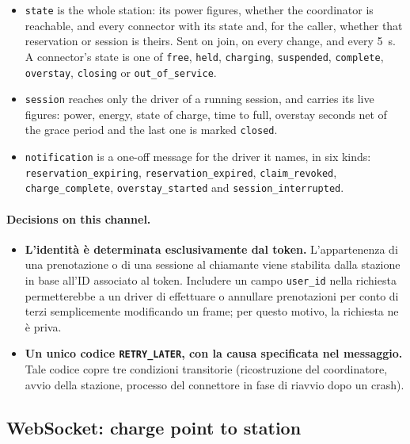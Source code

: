 \begin{itemize}
  \item \texttt{state} is the whole station: its power figures, whether the coordinator is
        reachable, and every connector with its state and, for the caller, whether that
        reservation or session is theirs. Sent on join, on every change, and every 5~s. A connector's
        state is one of \texttt{free}, \texttt{held}, \texttt{charging}, \texttt{suspended},
        \texttt{complete}, \texttt{overstay}, \texttt{closing} or \texttt{out\_of\_service}.
  \item \texttt{session} reaches only the driver of a running
        session, and carries its live figures: power, energy, state of charge, time to full,
        overstay seconds net of the grace period and the last one is marked \texttt{closed}.
  \item \texttt{notification} is a one-off message for the driver it names, in six kinds:
        \texttt{reservation\_\allowbreak expiring},
        \texttt{reservation\_\allowbreak expired},
        \texttt{claim\_\allowbreak revoked},
        \texttt{charge\_\allowbreak complete},
        \texttt{overstay\_\allowbreak started} and
        \texttt{session\_\allowbreak interrupted}.
\end{itemize}

\paragraph{Decisions on this channel.}
\begin{itemize}
  \item \textbf{L'identità è determinata esclusivamente dal token.} L'appartenenza di una prenotazione o di una sessione al chiamante viene stabilita dalla stazione in base all'ID associato al token. Includere un campo \texttt{user\_id} nella richiesta permetterebbe a un driver di effettuare o annullare prenotazioni per conto di terzi semplicemente modificando un frame; per questo motivo, la richiesta ne è priva.
  \item \textbf{Un unico codice \texttt{RETRY\_LATER}, con la causa specificata nel messaggio.} Tale codice copre tre condizioni transitorie (ricostruzione del coordinatore, avvio della stazione, processo del connettore in fase di riavvio dopo un crash).
\end{itemize}

\subsection{WebSocket: charge point to station}
\label{sec:api-ws-cp}

